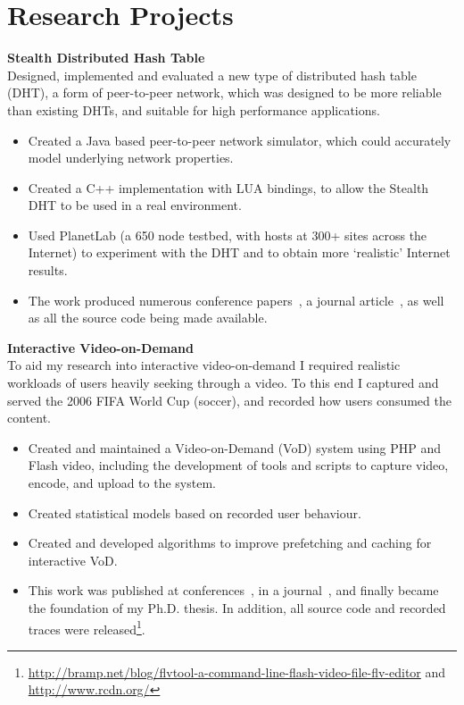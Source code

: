 \documentclass[a4paper,10pt]{article}
\begin{document}
\section{Research Projects}
 \textbf{Stealth Distributed Hash Table}\\
 Designed, implemented and evaluated a new type of distributed hash table (DHT), a form of peer-to-peer network, which was designed to be more reliable than 
existing DHTs, and suitable for high performance applications.

 \begin{itemize}
  \item Created a Java based peer-to-peer network simulator, which could accurately model underlying network properties.
  \item Created a C++ implementation with LUA bindings, to allow the Stealth DHT to be used in a real environment.
  \item Used PlanetLab (a 650 node testbed, with hosts at 300+ sites across the Internet) to experiment with the DHT and to obtain more `realistic' Internet results.
  \item The work produced numerous conference papers~\cite{rai2007pmp, brampton2006sdh, macquire2006asd, macquire2006pas,  brampton2005sdh}, a journal article~\cite{macquire2008asd}, as well as all the source code being made available.
 \end{itemize}
\vspace{1em}

\textbf{Interactive Video-on-Demand}\\
To aid my research into interactive video-on-demand I required realistic workloads of users heavily seeking through a video. To this end I captured and served the 2006 FIFA World Cup (soccer), and recorded how users consumed the content.

\begin{itemize}
 \item Created and maintained a Video-on-Demand (VoD) system using PHP and Flash video, including the development of tools and scripts to capture video, encode, and upload to the system.
 \item Created statistical models based on recorded user behaviour.
 \item Created and developed algorithms to improve prefetching and caching for interactive VoD.
 \item This work was published at conferences~\cite{brampton2007cui,macquire2008acf}, in a journal~\cite{brampton2008cew}, and finally became the foundation of my Ph.D. thesis. In addition, all source code and recorded traces were released\footnote{\href{http://bramp.net/blog/flvtool-a-command-line-flash-video-file-flv-editor}{http://bramp.net/blog/flvtool-a-command-line-flash-video-file-flv-editor} and \href{http://www.rcdn.org/}{http://www.rcdn.org/}}.
\end{itemize}
\vspace{1em}
\end{document}
